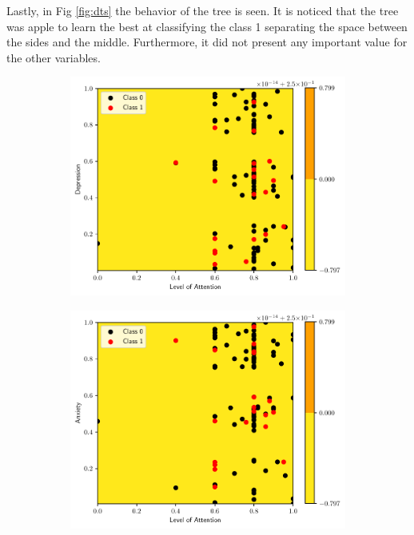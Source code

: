 Lastly, in Fig \ref{fig:dts} the behavior of the tree is seen. It is noticed
that the tree was apple to learn the best at classifying the class 1 separating
the space between the sides and the middle. Furthermore, it did not present any
important value for the other variables.

\begin{figure}
  \centering
  \begin{subfigure}[b]{0.32\textwidth}
    \centering \includegraphics[width=\textwidth]{figs/tree-contour-0-3.pdf}
    \caption{}
  \end{subfigure}
  \begin{subfigure}[b]{0.32\textwidth}
    \centering \includegraphics[width=\textwidth]{figs/tree-contour-0-4.pdf}

\end{subfigure}
\end{figure}
